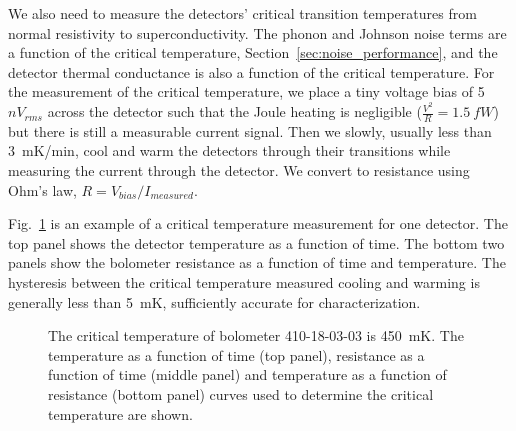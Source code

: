 \documentclass[../EBEXPaper2.tex]{subfiles}
\begin{document}
We also need to measure the detectors' critical transition temperatures from normal resistivity to superconductivity. 
The phonon and Johnson noise terms are a function of the critical temperature,  Section~\ref{sec:noise_performance}, and the detector thermal conductance is also a function of the critical temperature. 
For the measurement of the critical temperature, we place a tiny voltage bias of 5~$nV_{rms}$ across the detector such that the Joule heating is negligible ($\frac{V^2}{R} = 1.5~fW$) but there is still a measurable current signal. 
Then we slowly, usually less than 3~mK/min, cool and warm the detectors through their transitions while measuring the current through the detector. We convert to resistance using Ohm's law, $R=V_{bias}/I_{measured}$.

Fig.~\ref{fig:tc_measurement} is an example of a critical temperature measurement for one detector. 
The top panel shows the detector temperature as a function of time. %
The bottom two panels show the bolometer resistance as a function of time and temperature. 
The hysteresis between the critical temperature measured cooling and warming is generally less than 5~mK, sufficiently accurate for characterization.

\begin{figure}[htbp]
\begin{center}
\caption{The critical temperature of bolometer 410-18-03-03 is 450~mK.  The temperature as a function of time (top panel), resistance as a function of time (middle panel) and temperature as a function of resistance (bottom panel) curves used to determine the critical temperature are shown. 
}
\label{fig:tc_measurement}
\end{center}
\end{figure} 
\end{document}

